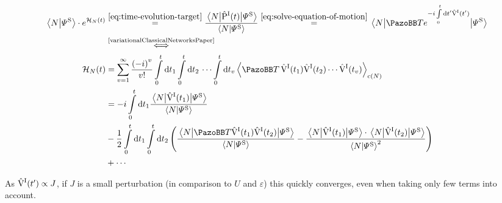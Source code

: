\begin{equation}
    \label{eq:cumulant-expansion}
    \begin{split}
        \braketHelper{N}{\picturePsi[\schroedingerPicture]{}} \cdot e^{\HNOft} &\stackrel{\ref{eq:time-evolution-target}}{=} \frac{\bracketHelper{N}{\timeEvolutionOperator[\interactionPicture]}{\picturePsi[\schroedingerPicture]{}}}{\braketHelper{N}{\picturePsi[\schroedingerPicture]{}}}
        \stackrel{\ref{eq:solve-equation-of-motion}}{=}
        \bracketHelper{N}{
            \timeOrderingOperator e^{-i\int\limits_0^t \text{d} t' \VhamiltonianOf[\interactionPicture]{t'}}
        }{\picturePsi[\schroedingerPicture]{}}\\
        &\stackrel{\text{\cite{variationalClassicalNetworksPaper}}}{\Longleftrightarrow}\\
        \HNOft &= \sum\limits_{v=1}^\infty \frac{\left(-i\right)^v}{v!} \int\limits_0^t\mathrm{d}t_1 \int\limits_0^t\mathrm{d}t_2 \,\,\dots \int\limits_0^t\mathrm{d}t_v \left\langle \timeOrderingOperator\, \VhamiltonianOf[\interactionPicture]{t_1}\VhamiltonianOf[\interactionPicture]{t_2} \cdots \VhamiltonianOf[\interactionPicture]{t_v} \right\rangle_{\text{c}(N)}\\
        &= -i \int\limits_0^t \mathrm{d}t_1 \frac{\bracketHelper{N}{\VhamiltonianOf[\interactionPicture]{t_1}}{\picturePsi[\schroedingerPicture]{}}}{\braketHelper{N}{\picturePsi[\schroedingerPicture]{}}}\\ 
        &- \frac{1}{2} \int\limits_0^t\mathrm{d}t_1 \int\limits_0^t\mathrm{d}t_2
        \left(
        \frac{\bracketHelper{N}{\timeOrderingOperator
        \VhamiltonianOf[\interactionPicture]{t_1}\VhamiltonianOf[\interactionPicture]{t_2}
        }{\picturePsi[\schroedingerPicture]{}}}{\braketHelper{N}{\picturePsi[\schroedingerPicture]{}}} -  \frac{\bracketHelper{N}{\VhamiltonianOf[\interactionPicture]{t_1}}{\picturePsi[\schroedingerPicture]{}} \cdot \bracketHelper{N}{\VhamiltonianOf[\interactionPicture]{t_2}}{\picturePsi[\schroedingerPicture]{}}}{\braketHelper{N}{\picturePsi[\schroedingerPicture]{}}^2}
        \right) 
        \hspace{-1.3cm} %
        \\
        &+ \cdots
    \end{split}
\end{equation}

As $\VhamiltonianOf[\interactionPicture]{t'} \propto J$, if $J$ is a small perturbation (in comparison to $U$ and $\varepsilon$) this quickly converges, even when taking only few terms into account.